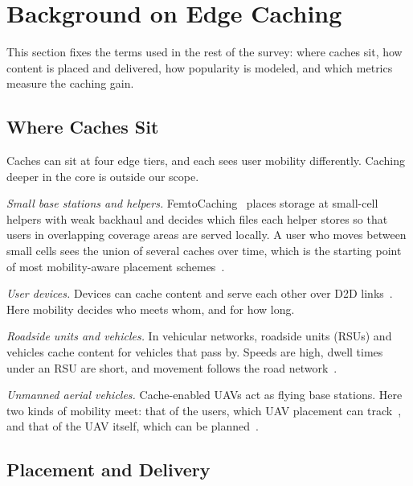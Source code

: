 
\section{Background on Edge Caching}
\label{sec:background}

This section fixes the terms used in the rest of the survey: where caches sit, how content is placed and delivered, how popularity is modeled, and which metrics measure the caching gain.

\subsection{Where Caches Sit}
\label{subsec:where}

Caches can sit at four edge tiers, and each sees user mobility differently. Caching deeper in the core is outside our scope.

\emph{Small base stations and helpers.} FemtoCaching~\cite{shanmugam2013femtocaching} places storage at small-cell helpers with weak backhaul and decides which files each helper stores so that users in overlapping coverage areas are served locally. A user who moves between small cells sees the union of several caches over time, which is the starting point of most mobility-aware placement schemes~\cite{poularakis2013exploiting,poularakis2017code,ozfatura2020mobility}.

\emph{User devices.} Devices can cache content and serve each other over D2D links~\cite{golrezaei2013femtocaching}. Here mobility decides who meets whom, and for how long.

\emph{Roadside units and vehicles.} In vehicular networks, roadside units (RSUs) and vehicles cache content for vehicles that pass by. Speeds are high, dwell times under an RSU are short, and movement follows the road network~\cite{alnagar2022mobility,mahmood2019rich,yu2021mobility}.

\emph{Unmanned aerial vehicles.} Cache-enabled UAVs act as flying base stations. Here two kinds of mobility meet: that of the users, which UAV placement can track~\cite{chen2017sky}, and that of the UAV itself, which can be planned~\cite{xu2018overcoming}.

\subsection{Placement and Delivery}
\label{subsec:placement}


